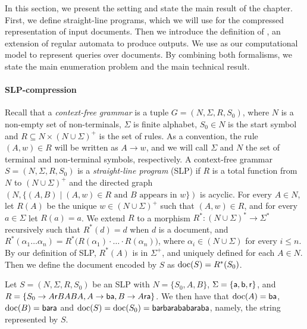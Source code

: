 In this section, we present the setting and state the main result of the chapter. 
First, we define straight-line programs, which we will use for the compressed representation of input documents. Then we introduce the definition of \rtname, an extension of regular automata to produce outputs. We use \rtnames as our computational model to represent queries over documents. 
By combining both formalisms, we state the main enumeration problem and the main technical result. %


\paragraph{SLP-compression} 
Recall that a \emph{context-free grammar} is a tuple $G = (N,\Sigma,R,S_0)$, where $N$ is a non-empty set of non-terminals, $\Sigma$ is finite alphabet, $S_0\in N$ is the start symbol and $R\subseteq N \times(N \cup\Sigma)^{+}$ is the set of rules. As a convention, the rule $(A,w) \in R$ will be written as $A\to w$, and we will call $\Sigma$ and $N$ the set of terminal and non-terminal symbols, respectively. A context-free grammar $S = (N,\Sigma,R,S_0)$ is a \emph{straight-line program} (SLP) if $R$ is a total function from $N$ to $(N \cup\Sigma)^{+}$ and the directed graph $(N, \{(A,B)\mid (A,w) \in R \text{ and } B\text{ appears in } w\})$ is acyclic. 
For every $A \in N$, let $R(A)$ be the unique $w \in (N \cup\Sigma)^{+}$ such that $(A,w) \in R$, and for every $a \in \Sigma$ let $R(a) = a$.
We extend $R$ to a morphism $R^*: (N \cup\Sigma)^*\to \Sigma^*$ recursively such that $R^*(d) = d$ when $d$ is a document, and $R^*(\alpha_1 \ldots \alpha_n) = R^*\big(R(\alpha_1) \cdot \ldots \cdot R(\alpha_n)\big)$, where $\alpha_i \in (N \cup \Sigma)$ for every $i \leq n$. 
By our definition of SLP, $R^*(A)$ is in $\Sigma^+$, and uniquely defined for each $A\in N$. 
Then we define the document encoded by $S$ as $\operatorname{doc}(S) = R^*(S_0)$.
\begin{example}	
	Let $S = (N, \Sigma, R, S_0)$ be an SLP with $N = \{S_0, A, B\}$, $\Sigma = \{{\sf a}, {\sf b}, {\sf r}\}$, and $R = \{S_0 \to A{\sf r}BABA, A\to {\sf ba}, B \to A{\sf ra}\}$. We then have that $\operatorname{doc}(A) = {\sf ba}$, $\operatorname{doc}(B) = {\sf bara}$ and $\operatorname{doc}(S) = \operatorname{doc}(S_0) = {\sf barbarababaraba}$, namely, the string represented by $S$.%
\end{example}

